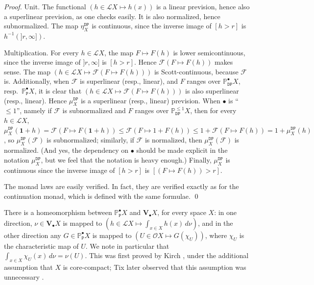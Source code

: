 \documentclass[preprint,12pt]{elsarticle}
\newcommand\Lform{\mathcal L}
\newcommand\Pred{\mathbb{P}}
\newcommand\Demon{{\mathtt{D}}}
\newcommand\Nature{{\mathtt{P}}}
\newcommand\DN{{\Demon\Nature}}
\newcommand\one{\mathbf 1}
\newcommand\Val{{\mathbf V}}
\newcommand\Open{{\mathcal O}}
\begin{document}
\begin{proof}
  Unit.  The functional $(h \in \Lform X \mapsto h (x))$ is a linear
  prevision, hence also a superlinear prevision, as one checks easily.
  It is also normalized, hence subnormalized.  The map $\eta^\DN_X$ is
  continuous, since the inverse image of $[h > r]$ is
  $h^{-1} (]r, \infty])$.

  Multiplication.  For every $h \in \Lform X$, the map
  $F \mapsto F (h)$ is lower semicontinuous, since the inverse image
  of $]r, \infty]$ is $[h > r]$.  Hence $\mathcal F (F \mapsto F (h))$
  makes sense.  The map
  $(h \in \Lform X \mapsto \mathcal F (F \mapsto F (h)))$ is
  Scott-continuous, because $\mathcal F$ is.  Additionally, when
  $\mathcal F$ is superlinear (resp., linear), and $F$ ranges over
  $\Pred_\DN^\bullet X$, resp.\ $\Pred_\Nature^\bullet X$, it is clear
  that $(h \in \Lform X \mapsto \mathcal F (F \mapsto F (h)))$ is also
  superlinear (resp., linear).  Hence $\mu^\DN_X$ is a superlinear
  (resp., linear) prevision.  When $\bullet$ is ``$\leq 1$'', namely
  if $\mathcal F$ is subnormalized and $F$ ranges over
  $\Pred_\DN^{\leq 1} X$, then for every $h \in \Lform X$,
  $\mu^\DN_X (\one+h) = \mathcal F (F \mapsto F (\one+h)) \leq
  \mathcal F (F \mapsto 1 + F (h)) \leq 1 + \mathcal F (F \mapsto F
  (h)) = 1+\mu^\DN_X (h)$, so $\mu^\DN_X (\mathcal F)$ is
  subnormalized; similarly, if $\mathcal F$ is normalized, then
  $\mu^\DN_X (\mathcal F)$ is normalized.  (And yes, the dependency on
  $\bullet$ should be made explicit in the notation $\mu^\DN_X$, but
  we feel that the notation is heavy enough.)  Finally, $\mu^\DN_X$ is
  continuous since the inverse image of $[h > r]$ is
  $[(F \mapsto F (h)) > r]$.

  The monad laws are easily verified.  In fact, they are verified
  exactly as for the continuation monad, which is defined with the
  same formulae.  \qed
\end{proof}

There is a homeomorphism between $\Pred_\Nature^\bullet X$ and
$\Val_\bullet X$, for every space $X$: in one direction,
$\nu \in \Val_\bullet X$ is mapped to
$(h \in \Lform X \mapsto \int_{x \in X} h (x) \,d\nu)$, and in the
other direction any $G \in \Pred_\Nature^\bullet X$ is mapped to
$(U \in \Open X \mapsto G (\chi_U))$, where $\chi_U$ is the
characteristic map of $U$.  We note in particular that
$\int_{x \in X} \chi_U (x) \,d\nu = \nu (U)$.  This was first proved
by Kirch \cite[Satz~8.1]{kirch93}, under the additional assumption
that $X$ is core-compact; Tix later observed that this assumption was
unnecessary \cite[Satz~4.16]{Tix:bewertung}.
\end{document}
